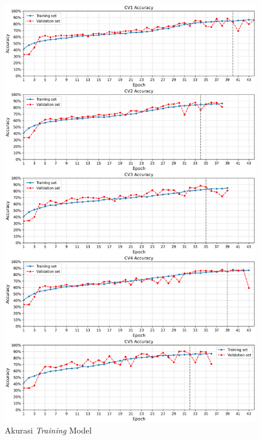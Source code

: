 \begin{table}[H]
           \begin{figure}[H]
              \centering
             \includegraphics[width= 1.0\linewidth]{figures/bab4/akurasi_plotfix.png}
              \caption{Akurasi \textit{Training} Model}
              \label{Akurasi Training Model Terbaik}
          \end{figure}


\end{table}
